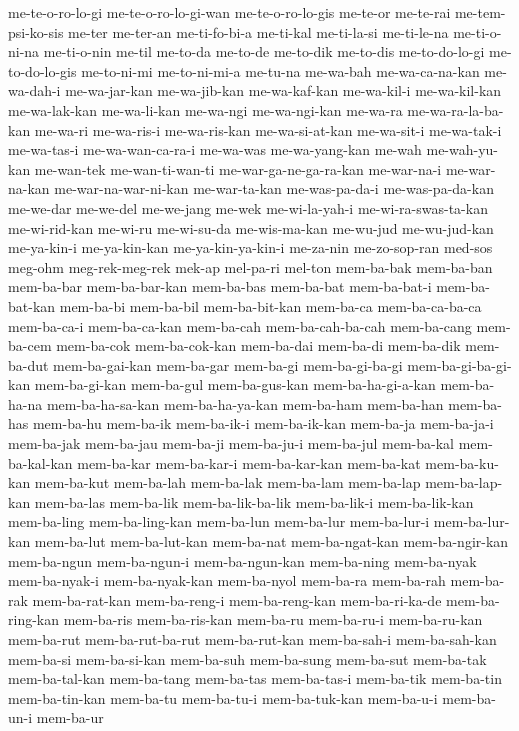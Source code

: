 {me-te-o-ro-lo-gi me-te-o-ro-lo-gi-wan me-te-o-ro-lo-gis me-te-or me-te-rai
me-tem-psi-ko-sis me-ter me-ter-an me-ti-fo-bi-a me-ti-kal me-ti-la-si
me-ti-le-na me-ti-o-ni-na me-ti-o-nin me-til me-to-da me-to-de me-to-dik
me-to-dis me-to-do-lo-gi me-to-do-lo-gis me-to-ni-mi me-to-ni-mi-a
me-tu-na me-wa-bah me-wa-ca-na-kan me-wa-dah-i me-wa-jar-kan me-wa-jib-kan
me-wa-kaf-kan me-wa-kil-i me-wa-kil-kan me-wa-lak-kan me-wa-li-kan
me-wa-ngi me-wa-ngi-kan me-wa-ra me-wa-ra-la-ba-kan me-wa-ri me-wa-ris-i
me-wa-ris-kan me-wa-si-at-kan me-wa-sit-i me-wa-tak-i me-wa-tas-i
me-wa-wan-ca-ra-i me-wa-was me-wa-yang-kan me-wah me-wah-yu-kan me-wan-tek
me-wan-ti-wan-ti me-war-ga-ne-ga-ra-kan me-war-na-i me-war-na-kan
me-war-na-war-ni-kan me-war-ta-kan me-was-pa-da-i me-was-pa-da-kan
me-we-dar me-we-del me-we-jang me-wek me-wi-la-yah-i me-wi-ra-swas-ta-kan
me-wi-rid-kan me-wi-ru me-wi-su-da me-wis-ma-kan me-wu-jud me-wu-jud-kan
me-ya-kin-i me-ya-kin-kan me-ya-kin-ya-kin-i me-za-nin me-zo-sop-ran
med-sos meg-ohm meg-rek-meg-rek mek-ap mel-pa-ri mel-ton mem-ba-bak
mem-ba-ban mem-ba-bar mem-ba-bar-kan mem-ba-bas mem-ba-bat mem-ba-bat-i
mem-ba-bat-kan mem-ba-bi mem-ba-bil mem-ba-bit-kan mem-ba-ca
mem-ba-ca-ba-ca mem-ba-ca-i mem-ba-ca-kan mem-ba-cah mem-ba-cah-ba-cah
mem-ba-cang mem-ba-cem mem-ba-cok mem-ba-cok-kan mem-ba-dai mem-ba-di
mem-ba-dik mem-ba-dut mem-ba-gai-kan mem-ba-gar mem-ba-gi mem-ba-gi-ba-gi
mem-ba-gi-ba-gi-kan mem-ba-gi-kan mem-ba-gul mem-ba-gus-kan
mem-ba-ha-gi-a-kan mem-ba-ha-na mem-ba-ha-sa-kan mem-ba-ha-ya-kan
mem-ba-ham mem-ba-han mem-ba-has mem-ba-hu mem-ba-ik mem-ba-ik-i
mem-ba-ik-kan mem-ba-ja mem-ba-ja-i mem-ba-jak mem-ba-jau mem-ba-ji
mem-ba-ju-i mem-ba-jul mem-ba-kal mem-ba-kal-kan mem-ba-kar mem-ba-kar-i
mem-ba-kar-kan mem-ba-kat mem-ba-ku-kan mem-ba-kut mem-ba-lah mem-ba-lak
mem-ba-lam mem-ba-lap mem-ba-lap-kan mem-ba-las mem-ba-lik
mem-ba-lik-ba-lik mem-ba-lik-i mem-ba-lik-kan mem-ba-ling mem-ba-ling-kan
mem-ba-lun mem-ba-lur mem-ba-lur-i mem-ba-lur-kan mem-ba-lut
mem-ba-lut-kan mem-ba-nat mem-ba-ngat-kan mem-ba-ngir-kan mem-ba-ngun
mem-ba-ngun-i mem-ba-ngun-kan mem-ba-ning mem-ba-nyak mem-ba-nyak-i
mem-ba-nyak-kan mem-ba-nyol mem-ba-ra mem-ba-rah mem-ba-rak mem-ba-rat-kan
mem-ba-reng-i mem-ba-reng-kan mem-ba-ri-ka-de mem-ba-ring-kan mem-ba-ris
mem-ba-ris-kan mem-ba-ru mem-ba-ru-i mem-ba-ru-kan mem-ba-rut
mem-ba-rut-ba-rut mem-ba-rut-kan mem-ba-sah-i mem-ba-sah-kan mem-ba-si
mem-ba-si-kan mem-ba-suh mem-ba-sung mem-ba-sut mem-ba-tak mem-ba-tal-kan
mem-ba-tang mem-ba-tas mem-ba-tas-i mem-ba-tik mem-ba-tin mem-ba-tin-kan
mem-ba-tu mem-ba-tu-i mem-ba-tuk-kan mem-ba-u-i mem-ba-un-i mem-ba-ur
}
